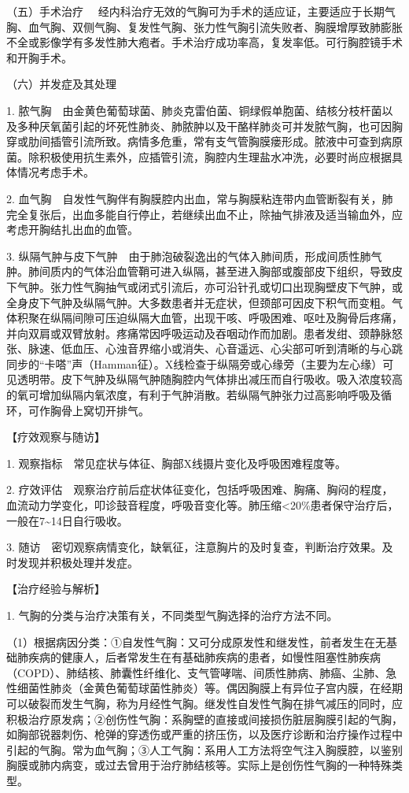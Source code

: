 {（五）手术治疗}
　经内科治疗无效的气胸可为手术的适应证，主要适应于长期气胸、血气胸、双侧气胸、复发性气胸、张力性气胸引流失败者、胸膜增厚致肺膨胀不全或影像学有多发性肺大疱者。手术治疗成功率高，复发率低。可行胸腔镜手术和开胸手术。

{（六）并发症及其处理}

1.
脓气胸　由金黄色葡萄球菌、肺炎克雷伯菌、铜绿假单胞菌、结核分枝杆菌以及多种厌氧菌引起的坏死性肺炎、肺脓肿以及干酪样肺炎可并发脓气胸，也可因胸穿或肋间插管引流所致。病情多危重，常有支气管胸膜瘘形成。脓液中可查到病原菌。除积极使用抗生素外，应插管引流，胸腔内生理盐水冲洗，必要时尚应根据具体情况考虑手术。

2.
血气胸　自发性气胸伴有胸膜腔内出血，常与胸膜粘连带内血管断裂有关，肺完全复张后，出血多能自行停止，若继续出血不止，除抽气排液及适当输血外，应考虑开胸结扎出血的血管。

3.
纵隔气肿与皮下气肿　由于肺泡破裂逸出的气体入肺间质，形成间质性肺气肿。肺间质内的气体沿血管鞘可进入纵隔，甚至进入胸部或腹部皮下组织，导致皮下气肿。张力性气胸抽气或闭式引流后，亦可沿针孔或切口出现胸壁皮下气肿，或全身皮下气肿及纵隔气肿。大多数患者并无症状，但颈部可因皮下积气而变粗。气体积聚在纵隔间隙可压迫纵隔大血管，出现干咳、呼吸困难、呕吐及胸骨后疼痛，并向双肩或双臂放射。疼痛常因呼吸运动及吞咽动作而加剧。患者发绀、颈静脉怒张、脉速、低血压、心浊音界缩小或消失、心音遥远、心尖部可听到清晰的与心跳同步的“卡嗒”声（Hamman征）。X线检查于纵隔旁或心缘旁（主要为左心缘）可见透明带。皮下气肿及纵隔气肿随胸腔内气体排出减压而自行吸收。吸入浓度较高的氧可增加纵隔内氧浓度，有利于气肿消散。若纵隔气肿张力过高影响呼吸及循环，可作胸骨上窝切开排气。

【疗效观察与随访】

1. 观察指标　常见症状与体征、胸部X线摄片变化及呼吸困难程度等。

2.
疗效评估　观察治疗前后症状体征变化，包括呼吸困难、胸痛、胸闷的程度，血流动力学变化，叩诊鼓音程度，呼吸音变化等。肺压缩\textless{}20\%患者保守治疗后，一般在7\textasciitilde{}14日自行吸收。

3.
随访　密切观察病情变化，缺氧征，注意胸片的及时复查，判断治疗效果。及时发现并积极处理并发症。

【治疗经验与解析】

1. 气胸的分类与治疗决策有关，不同类型气胸选择的治疗方法不同。

（1）根据病因分类：①自发性气胸：又可分成原发性和继发性，前者发生在无基础肺疾病的健康人，后者常发生在有基础肺疾病的患者，如慢性阻塞性肺疾病（COPD）、肺结核、肺囊性纤维化、支气管哮喘、间质性肺病、肺癌、尘肺、急性细菌性肺炎（金黄色葡萄球菌性肺炎）等。偶因胸膜上有异位子宫内膜，在经期可以破裂而发生气胸，称为月经性气胸。继发性自发性气胸在排气减压的同时，应积极治疗原发病；②创伤性气胸：系胸壁的直接或间接损伤脏层胸膜引起的气胸，如胸部锐器刺伤、枪弹的穿透伤或严重的挤压伤，以及医疗诊断和治疗操作过程中引起的气胸。常为血气胸；③人工气胸：系用人工方法将空气注入胸膜腔，以鉴别胸膜或肺内病变，或过去曾用于治疗肺结核等。实际上是创伤性气胸的一种特殊类型。

